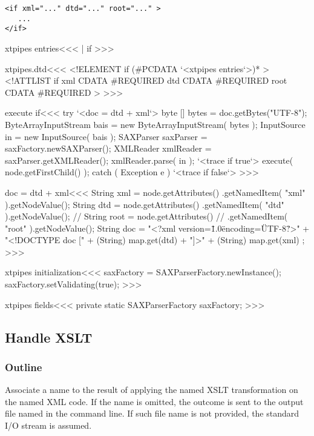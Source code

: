 \documentclass{article}
\begin{document}
{\begin{verbatim}
<if xml="..." dtd="..." root="..." >
   ...
</if>
\end{verbatim}


\<xtpipes entries\><<<
| if
>>>


\<xtpipes.dtd\><<<
<!ELEMENT if (#PCDATA `<xtpipes entries`>)* >
<!ATTLIST if
          xml CDATA #REQUIRED
          dtd CDATA #REQUIRED
          root CDATA #REQUIRED
>
>>>

\<execute if\><<<
try{
   `<doc = dtd + xml`>
   byte [] bytes = doc.getBytes("UTF-8");
   ByteArrayInputStream bais = new ByteArrayInputStream( bytes );
   InputSource in = new InputSource( bais );
   SAXParser saxParser = saxFactory.newSAXParser();
   XMLReader xmlReader = saxParser.getXMLReader();
   xmlReader.parse( in );
   `<trace if true`>
   execute( node.getFirstChild() );
} catch ( Exception e ){ `<trace if false`> }
>>>


\<doc = dtd + xml\><<<
String xml = node.getAttributes()
                 .getNamedItem( "xml" ).getNodeValue();
String dtd = node.getAttributes()
                 .getNamedItem( "dtd" ).getNodeValue();
// String root = node.getAttributes()
//                 .getNamedItem( "root" ).getNodeValue();
String doc = "<?xml version=\"1.0\" encoding=\"UTF-8\" ?>\n"
             + "<!DOCTYPE doc [\n"
             + (String) map.get(dtd)
             + "\n]>\n"
             + (String) map.get(xml) ;
>>>



\<xtpipes initialization\><<<
saxFactory = SAXParserFactory.newInstance();
saxFactory.setValidating(true);
>>>


\<xtpipes fields\><<<
private static SAXParserFactory saxFactory;
>>>


\subsection{Handle XSLT}

\subsubsection{Outline}

Associate a name to the result of applying the named XSLT
transformation on the named XML code.  If the name is omitted, the
outcome is sent to the output file named in the command line. If such
file name is not provided, the standard I/O stream is assumed.


}
\end{document}
